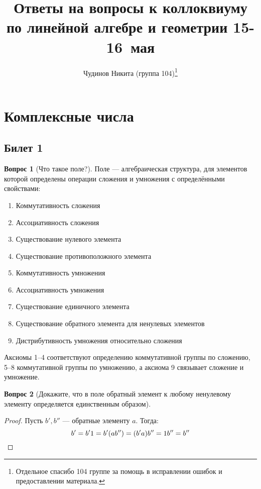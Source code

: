 \documentclass[a4paper,11pt]{article}
\theoremstyle{remark}
\theoremstyle{definition}
\newtheorem{question}{Вопрос}
\numberwithin{question}{subsection}
\begin{document}
\sloppy
\author{Чудинов Никита (группа 104)\thanks{Отдельное спасибо 104 группе за помощь в исправлении ошибок и предоставлении материала.}}
\date{}
\title{\vspace{-2.0cm}Ответы на вопросы к коллоквиуму по линейной алгебре и геометрии 15-16~мая}
\frenchspacing

\maketitle

\section{Комплексные числа}
\subsection{Билет 1}
\begin{question}[Что такое поле?]
Поле --- алгебраическая структура, для элементов которой определены операции сложения и умножения с определёнными свойствами:
\begin{enumerate}
	\item Коммутативность сложения
	\item Ассоциативность сложения
	\item Существование нулевого элемента
	\item Существование противоположного элемента
	\item Коммутативность умножения
	\item Ассоциативность умножения
	\item Существование единичного элемента
	\item Существование обратного элемента для ненулевых элементов
	\item Дистрибутивность умножения относительно сложения
\end{enumerate}
Аксиомы 1--4 соответствуют определению коммутативной группы по сложению, 5--8 коммутативной группы по умножению, а аксиома 9 связывает сложение и умножение. 
\end{question}

\begin{question}[Докажите, что в поле обратный элемент к любому ненулевому элементу определяется единственным образом]
\(\) %
\begin{proof}
Пусть \(b', b''\) --- обратные элементу \(a\). Тогда:
\begin{equation*}
	b' = b'1 = b'(ab'') = (b'a)b'' = 1b'' = b'' \qedhere
\end{equation*}
\end{proof}
\end{question}
\end{document}
